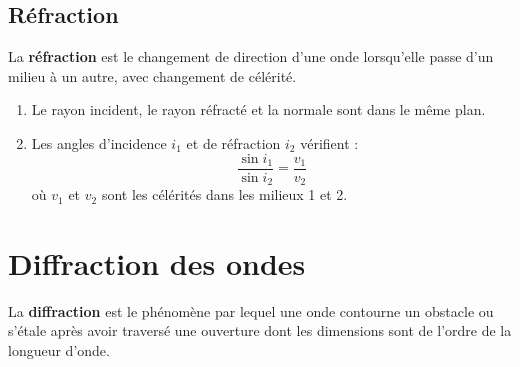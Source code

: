 \subsection{Réfraction}

\begin{definition}[Réfraction]
La \textbf{réfraction} est le changement de direction d'une onde lorsqu'elle passe d'un milieu à un autre, avec changement de célérité.
\end{definition}

\begin{loi}
\begin{enumerate}
    \item Le rayon incident, le rayon réfracté et la normale sont dans le même plan.
    \item Les angles d'incidence $i_1$ et de réfraction $i_2$ vérifient :
    \[
    \boxed{\frac{\sin i_1}{\sin i_2} = \frac{v_1}{v_2}}
    \]
    où $v_1$ et $v_2$ sont les célérités dans les milieux 1 et 2.
\end{enumerate}
\end{loi}

\begin{illus}
\end{illus}

\section{Diffraction des ondes}

\begin{definition}[Diffraction]
La \textbf{diffraction} est le phénomène par lequel une onde contourne un obstacle ou s'étale après avoir traversé une ouverture dont les dimensions sont de l'ordre de la longueur d'onde.
\end{definition}

